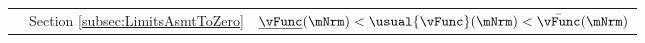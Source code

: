\begin{table}
{\begin{tabular}{|l|l|l|}
    \\                                                                                                                      & Section \ref{subsec:LimitsAsmtToZero}   & $\underline{\vFunc}(\mNrm) < \usual{\vFunc}(\mNrm) < \bar{\vFunc}(\mNrm)$ %


\end{tabular}}
\end{table}
